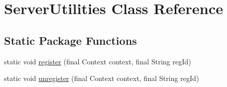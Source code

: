 \hypertarget{classcom_1_1axcoto_1_1shinjuku_1_1sushi_1_1_server_utilities}{\section{\-Server\-Utilities \-Class \-Reference}
\label{classcom_1_1axcoto_1_1shinjuku_1_1sushi_1_1_server_utilities}
}
\subsection*{\-Static \-Package \-Functions}
\begin{DoxyCompactItemize}
\item 
static void \hyperlink{classcom_1_1axcoto_1_1shinjuku_1_1sushi_1_1_server_utilities_a08c4d36e81c0008228393042e0795f22}{register} (final \-Context context, final \-String reg\-Id)
\item 
static void \hyperlink{classcom_1_1axcoto_1_1shinjuku_1_1sushi_1_1_server_utilities_a44706d693b19b2029a2f9beb55a3d4e1}{unregister} (final \-Context context, final \-String reg\-Id)
\end{DoxyCompactItemize}


